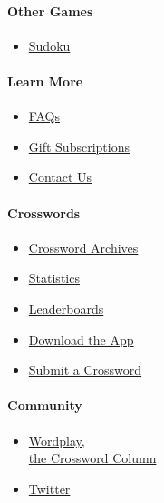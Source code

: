 \hypertarget{other-games-1}{%
\paragraph{Other Games}\label{other-games-1}}

\begin{itemize}
\tightlist
\item
  \href{/puzzles/sudoku}{Sudoku}
\end{itemize}

\hypertarget{learn-more}{%
\paragraph{Learn More}\label{learn-more}}

\begin{itemize}
\tightlist
\item
  \href{https://help.nytimes3xbfgragh.onion/hc/en-us/articles/115014755667-New-York-Times-Crossword}{FAQs}
\item
  \href{https://nytimes3xbfgragh.onion/subscription/crosswords/gift}{Gift
  Subscriptions}
\item
  \href{mailto:NYTCrossword@NYTimes.com}{Contact Us}
\end{itemize}

\hypertarget{crosswords}{%
\paragraph{Crosswords}\label{crosswords}}

\begin{itemize}
\tightlist
\item
  \href{/crosswords/archive}{Crossword Archives}
\item
  \href{/puzzles/stats}{Statistics}
\item
  \href{/puzzles/leaderboards}{Leaderboards}
\item
  \href{/crosswords/apps}{Download the App}
\item
  \href{/puzzles/submissions/crossword}{Submit a Crossword}
\end{itemize}

\hypertarget{community}{%
\paragraph{Community}\label{community}}

\begin{itemize}
\tightlist
\item
  \href{https://nytimes3xbfgragh.onion/column/wordplay}{Wordplay,\\
  the Crossword Column}
\item
  \href{https://twitter.com/NYTimesWordplay}{Twitter}
\end{itemize}

